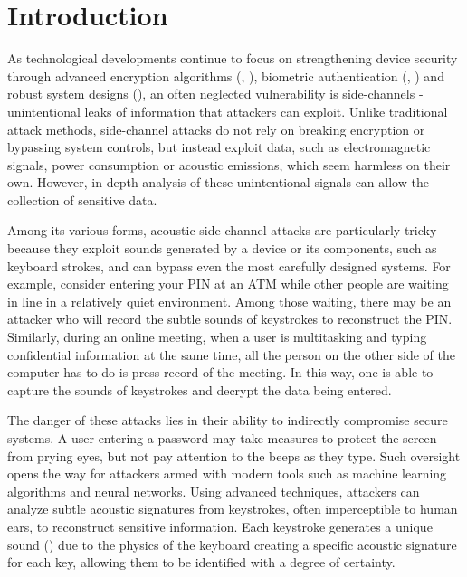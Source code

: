 \documentclass[a4paper,11pt,twoside]{report}
\theoremstyle{definition}
\begin{document}
\pagestyle{fancy}
\setcounter{page}{11}


\chapter{Introduction}

As technological developments continue to focus on strengthening device security through advanced encryption algorithms (\textit{\cite{encryption}}, \textit{\cite{imageencryption}}), biometric authentication (\textit{\cite{biometric1}}, \textit{\cite{biometric2}}) and robust system designs (\textit{\cite{securesystem}}), an often neglected vulnerability is side-channels - unintentional leaks of information that attackers can exploit. Unlike traditional attack methods, side-channel attacks do not rely on breaking encryption or bypassing system controls, but instead exploit data, such as electromagnetic signals, power consumption or acoustic emissions, which seem harmless on their own. However, in-depth analysis of these unintentional signals can allow the collection of sensitive data.

Among its various forms, acoustic side-channel attacks are particularly tricky because they exploit sounds generated by a device or its components, such as keyboard strokes, and can bypass even the most carefully designed systems. For example, consider entering your PIN at an ATM while other people are waiting in line in a relatively quiet environment. Among those waiting, there may be an attacker who will record the subtle sounds of keystrokes to reconstruct the PIN. Similarly, during an online meeting, when a user is multitasking and typing confidential information at the same time, all the person on the other side of the computer has to do is press record of the meeting. In this way, one is able to capture the sounds of keystrokes and decrypt the data being entered.

The danger of these attacks lies in their ability to indirectly compromise secure systems. A user entering a password may take measures to protect the screen from prying eyes, but not pay attention to the beeps as they type. Such oversight opens the way for attackers armed with modern tools such as machine learning algorithms and neural networks. Using advanced techniques, attackers can analyze subtle acoustic signatures from keystrokes, often imperceptible to human ears, to reconstruct sensitive information. Each keystroke generates a unique sound (\textit{\cite{uniquekeys}}) due to the physics of the keyboard creating a specific acoustic signature for each key, allowing them to be identified with a degree of certainty.
\end{document}
